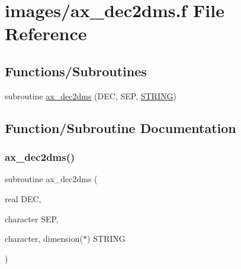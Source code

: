 \hypertarget{ax__dec2dms_8f}{}\section{images/ax\+\_\+dec2dms.f File Reference}
\label{ax__dec2dms_8f}
\subsection*{Functions/\+Subroutines}
\begin{DoxyCompactItemize}
\item 
subroutine \hyperlink{ax__dec2dms_8f_adef73ebcfd66e37a5019d96a65a8ae42}{ax\+\_\+dec2dms} (D\+EC, S\+EP, \hyperlink{eval__tab_8h_a0f4d394a3ab4e09bff60f714c66dc5ee}{S\+T\+R\+I\+NG})
\end{DoxyCompactItemize}


\subsection{Function/\+Subroutine Documentation}
\mbox{\label{ax__dec2dms_8f_adef73ebcfd66e37a5019d96a65a8ae42}} 
\subsubsection{\texorpdfstring{ax\+\_\+dec2dms()}{ax\_dec2dms()}}
{\footnotesize\ttfamily subroutine ax\+\_\+dec2dms (\begin{DoxyParamCaption}\item[{real}]{D\+EC,  }\item[{character}]{S\+EP,  }\item[{character, dimension($\ast$)}]{S\+T\+R\+I\+NG }\end{DoxyParamCaption})}

